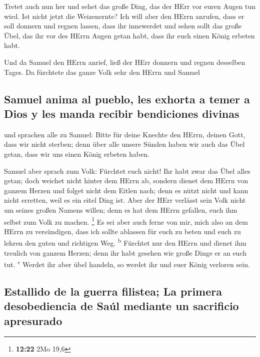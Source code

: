  Tretet auch nun her und sehet das große Ding, das der
HErr vor euren Augen tun wird.  Ist nicht jetzt die
Weizenernte? Ich will aber den HErrn anrufen, dass er soll donnern und
regnen lassen, dass ihr innewerdet und sehen sollt das große Übel, das
ihr vor des HErrn Augen getan habt, dass ihr euch einen König erbeten
habt.

 Und da Samuel den HErrn anrief, ließ der HErr donnern
und regnen desselben Tages. Da fürchtete das ganze Volk sehr den HErrn
und Samuel

\hypertarget{samuel-anima-al-pueblo-les-exhorta-a-temer-a-dios-y-les-manda-recibir-bendiciones-divinas}{%
\subsection{Samuel anima al pueblo, les exhorta a temer a Dios y les
manda recibir bendiciones
divinas}\label{samuel-anima-al-pueblo-les-exhorta-a-temer-a-dios-y-les-manda-recibir-bendiciones-divinas}}

 und sprachen alle zu Samuel: Bitte für deine Knechte den
HErrn, deinen Gott, dass wir nicht sterben; denn über alle unsere Sünden
haben wir auch das Übel getan, dass wir uns einen König erbeten haben.

 Samuel aber sprach zum Volk: Fürchtet euch nicht! Ihr
habt zwar das Übel alles getan; doch weichet nicht hinter dem HErrn ab,
sondern dienet dem HErrn von ganzem Herzen  und folget
nicht dem Eitlen nach; denn es nützt nicht und kann nicht erretten, weil
es ein eitel Ding ist.  Aber der HErr verlässt sein Volk
nicht um seines großen Namens willen; denn es hat dem HErrn gefallen,
euch ihm selbst zum Volk zu machen. \footnote{\textbf{12:22} 2Mo 19,6}
 Es sei aber auch ferne von mir, mich also an dem HErrn
zu versündigen, dass ich sollte ablassen für euch zu beten und euch zu
lehren den guten und richtigen Weg. \textsuperscript{b} 
Fürchtet nur den HErrn und dienet ihm treulich von ganzem Herzen; denn
ihr habt gesehen wie große Dinge er an euch tut. \textsuperscript{c}
 Werdet ihr aber übel handeln, so werdet ihr und euer
König verloren sein.

\hypertarget{estallido-de-la-guerra-filistea-la-primera-desobediencia-de-sauxfal-mediante-un-sacrificio-apresurado}{%
\subsection{Estallido de la guerra filistea; La primera desobediencia de
Saúl mediante un sacrificio
apresurado}\label{estallido-de-la-guerra-filistea-la-primera-desobediencia-de-sauxfal-mediante-un-sacrificio-apresurado}}

